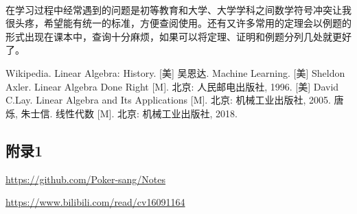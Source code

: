 \documentclass{article}
\begin{document}
\paragraph{}
在学习过程中经常遇到的问题是初等教育和大学、大学学科之间数学符号冲突让我很头疼，希望能有统一的标准，方便查阅使用。还有又许多常用的定理会以例题的形式出现在课本中，查询十分麻烦，如果可以将定理、证明和例题分列几处就更好了。

\newpage
\begin{thebibliography}{99}
     Wikipedia. Linear Algebra: History.
     [美] 吴恩达. Machine Learning.
     [美] Sheldon Axler. Linear Algebra Done Right [M]. 北京: 人民邮电出版社, 1996.
     [美] David C.Lay. Linear Algebra and Its Applications [M]. 北京: 机械工业出版社, 2005.
     唐烁, 朱士信. 线性代数 [M]. 北京: 机械工业出版社, 2018.
\end{thebibliography}

\begin{appendix}
    \section{附录1}

    \href{https://github.com/Poker-sang/Notes}{https://github.com/Poker-sang/Notes}

    \href{https://www.bilibili.com/read/cv16091164}{https://www.bilibili.com/read/cv16091164}
\end{appendix}
\end{document}
